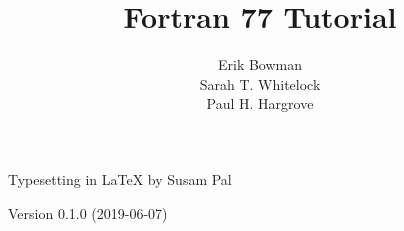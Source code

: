 \documentclass{article}
\title{Fortran 77 Tutorial}
\author{
    Erik Bowman \\
    Sarah T. Whitelock \\
    Paul H. Hargrove \\
}
\date{}
\begin{document}
\maketitle
\begin{center}
\small
Typesetting in \LaTeX{} by Susam Pal

Version 0.1.0 (2019-06-07)
\end{center}

\ifdefined\mini
    \pagebreak
\else
    \bigskip
\fi

{
    \ifdefined\mini\small\fi
    \tableofcontents
}







\end{document}
